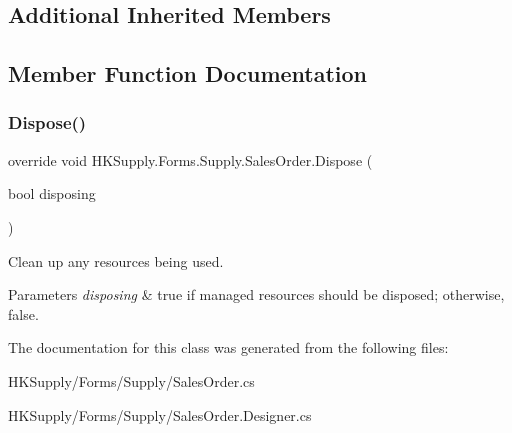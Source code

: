 \subsection*{Additional Inherited Members}


\subsection{Member Function Documentation}
\mbox{\label{class_h_k_supply_1_1_forms_1_1_supply_1_1_sales_order_a67753c36317bb1b19f4d016da0df068f}} 
\subsubsection{\texorpdfstring{Dispose()}{Dispose()}}
{\footnotesize\ttfamily override void H\+K\+Supply.\+Forms.\+Supply.\+Sales\+Order.\+Dispose (\begin{DoxyParamCaption}\item[{bool}]{disposing }\end{DoxyParamCaption})\hspace{0.3cm}{\ttfamily [protected]}}



Clean up any resources being used. 


\begin{DoxyParams}{Parameters}
{\em disposing} & true if managed resources should be disposed; otherwise, false.\\
\hline
\end{DoxyParams}


The documentation for this class was generated from the following files\+:\begin{DoxyCompactItemize}
\item 
H\+K\+Supply/\+Forms/\+Supply/Sales\+Order.\+cs\item 
H\+K\+Supply/\+Forms/\+Supply/Sales\+Order.\+Designer.\+cs\end{DoxyCompactItemize}
